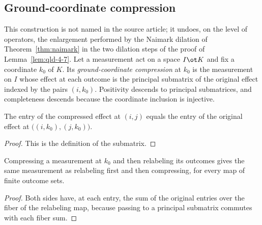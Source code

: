 	\subsection{Ground-coordinate compression}


	\begin{definition}
		\label{def:ground-compress-measurement}
		\leanok
		This construction is not named in the source article; it undoes, on the
		level of operators, the enlargement performed by the Naimark dilation of
		Theorem~\ref{thm:naimark} in the two dilation steps of the proof of
		Lemma~\ref{lem:qld-4-7}. Let a measurement act on a space $I \ot K$ and fix
		a coordinate $k_0$ of $K$. Its \emph{ground-coordinate compression} at
		$k_0$ is the measurement on $I$ whose effect at each outcome is the
		principal submatrix of the original effect indexed by the pairs
		$(i, k_0)$. Positivity descends to principal submatrices, and completeness
		descends because the coordinate inclusion is injective.
	\end{definition}

	\begin{lemma}
		\label{lem:ground-compress-effect}
		\leanok
		The entry of the compressed effect at $(i, j)$ equals the entry of the
		original effect at $\bigl((i, k_0), (j, k_0)\bigr)$.
	\end{lemma}
	\begin{proof}
		\leanok
		This is the definition of the submatrix.
	\end{proof}

	\begin{lemma}
		\label{lem:ground-compress-postprocess}
		\leanok
		Compressing a measurement at $k_0$ and then relabeling its outcomes gives
		the same measurement as relabeling first and then compressing, for every
		map of finite outcome sets.
	\end{lemma}
	\begin{proof}
		\leanok
		Both sides have, at each entry, the sum of the original entries over the
		fiber of the relabeling map, because passing to a principal submatrix
		commutes with each fiber sum.
	\end{proof}

